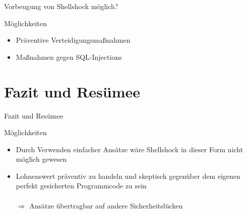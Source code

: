 \documentclass[handout]{beamer}
\begin{document}
\begin{frame}{Vorbeugung von Shellshock möglich?}
\begin{block}{Möglichkeiten}
\begin{itemize}[<+->]
\item Präventive Verteidigungsmaßnahmen
\item Maßnahmen gegen SQL-Injections
\end{itemize}
\end{block}
\end{frame}





\section[Fazit]{Fazit und Resümee}
\begin{frame}{Fazit und Resümee}
\begin{block}{Möglichkeiten}
\begin{itemize}[<+->]
\item Durch Verwenden einfacher Ansätze wäre Shellshock in dieser Form nicht möglich gewesen
\item Lohnenswert präventiv zu handeln und skeptisch gegenüber dem eigenen perfekt gesicherten Programmcode zu sein \\
\\
$\Rightarrow$ Ansätze übertragbar auf andere Sicherheitslücken
\end{itemize}
\end{block}
\end{frame}
\end{document}
